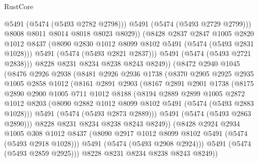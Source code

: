 \begin{lexlean}{RustCore}
\begin{coremodule}
                      @5491
                      (@5474 (@5493 @2782 @2798)))
                    @5491
                    (@5474 (@5493 @2729 @2799)))
                  @8008
                  @8011
                  @8014
                  @8018
                  @8023
                  @8029))
              (@8428
                @2837
                @2847
                @1005
                @2820
                @1012
                @8437
                (@8090 @2830 @1012 @8099 @8102 @5491 (@5474 (@5493 @2831 @1028)))
                @5491
                (@5474 (@5493 @2821 @2837)))
              @5491
              (@5474 (@5493 @2721 @2838)))
            @8228
            @8231
            @8234
            @8238
            @8243
            @8249))
        (@8472
          @2940
          @1045
          (@8476
            @2926
            @2938
            (@8481
              @2926
              @2936
              @1738
              (@8370
                @2905
                @2925
                @2935
                @1005
                @2858
                @1012
                (@8161
                  @2891
                  @2903
                  (@8167
                    @2891
                    @2901
                    @1738
                    (@8175
                      @2890
                      @2900
                      @1005
                      @711
                      @1012
                      @8188
                      (@8194
                        @2889
                        @2899
                        @1005
                        @2872
                        @1012
                        @8203
                        (@8090 @2882 @1012 @8099 @8102 @5491 (@5474 (@5493 @2883 @1028)))
                        @5491
                        (@5474 (@5493 @2873 @2889)))
                      @5491
                      (@5474 (@5493 @2863 @2890)))
                    @8228
                    @8231
                    @8234
                    @8238
                    @8243
                    @8249))
                (@8428
                  @2924
                  @2934
                  @1005
                  @308
                  @1012
                  @8437
                  (@8090 @2917 @1012 @8099 @8102 @5491 (@5474 (@5493 @2918 @1028)))
                  @5491
                  (@5474 (@5493 @2908 @2924)))
                @5491
                (@5474 (@5493 @2859 @2925)))
              @8228
              @8231
              @8234
              @8238
              @8243
              @8249))

\end{coremodule}
\end{lexlean}
